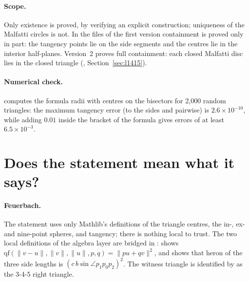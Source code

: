 \documentclass[11pt]{article}
\theoremstyle{definition}
\theoremstyle{remark}
\begin{document}
\paragraph{Scope.} Only existence is proved, by verifying an explicit construction;
uniqueness of the Malfatti circles is not. In the files of the first version containment is proved
only in part: the tangency points lie on the side segments and the centres lie in the interior
half-planes. Version~2 proves full containment: each closed Malfatti disc lies in the closed
triangle (, Section~\ref{sec:l1415}).

\paragraph{Numerical check.}  computes the formula radii with centres
on the bisectors for 2{,}000 random triangles: the maximum tangency error (to the sides and
pairwise) is $2.6\times10^{-10}$, while adding $0.01$ inside the bracket of the formula gives errors
of at least $6.5\times10^{-3}$.

\section{Does the statement mean what it says?}\label{sec:correct}

\paragraph{Feuerbach.} The statement uses only Mathlib's definitions of the triangle centres, the
in-, ex- and nine-point spheres, and tangency; there is nothing local to trust. The two local
definitions of the algebra layer are bridged in :
 shows $\mathrm{qf}(\|v-u\|,\|v\|,\|u\|,p,q)=\|pu+qv\|^2$, and
 shows that $\mathrm{heron}$ of the three side lengths is
$(c\,b\sin\angle p_1p_0p_2)^2$. The witness triangle  is identified by
 as the 3-4-5 right triangle.
\end{document}
